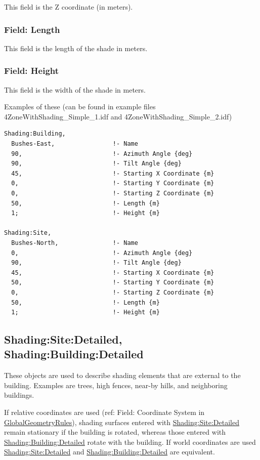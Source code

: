 This field is the Z coordinate (in meters).

\subsubsection{Field: Length}\label{field-length-16}

This field is the length of the shade in meters.

\subsubsection{Field: Height}\label{field-height-10}

This field is the width of the shade in meters.

Examples of these (can be found in example files 4ZoneWithShading\_Simple\_1.idf and 4ZoneWithShading\_Simple\_2.idf)

\begin{lstlisting}
Shading:Building,
  Bushes-East,                !- Name
  90,                         !- Azimuth Angle {deg}
  90,                         !- Tilt Angle {deg}
  45,                         !- Starting X Coordinate {m}
  0,                          !- Starting Y Coordinate {m}
  0,                          !- Starting Z Coordinate {m}
  50,                         !- Length {m}
  1;                          !- Height {m}

Shading:Site,
  Bushes-North,               !- Name
  0,                          !- Azimuth Angle {deg}
  90,                         !- Tilt Angle {deg}
  45,                         !- Starting X Coordinate {m}
  50,                         !- Starting Y Coordinate {m}
  0,                          !- Starting Z Coordinate {m}
  50,                         !- Length {m}
  1;                          !- Height {m}
\end{lstlisting}

\subsection{Shading:Site:Detailed, Shading:Building:Detailed}\label{shadingsitedetailed-shadingbuildingdetailed}

These objects are used to describe shading elements that are external to the building. Examples are trees, high fences, near-by hills, and neighboring buildings.

If relative coordinates are used (ref: Field: Coordinate System in \hyperref[globalgeometryrules]{GlobalGeometryRules}), shading surfaces entered with \hyperref[shadingsitedetailed-shadingbuildingdetailed]{Shading:Site:Detailed} remain stationary if the building is rotated, whereas those entered with \hyperref[shadingsitedetailed-shadingbuildingdetailed]{Shading:Building:Detailed} rotate with the building. If world coordinates are used \hyperref[shadingsitedetailed-shadingbuildingdetailed]{Shading:Site:Detailed} and \hyperref[shadingsitedetailed-shadingbuildingdetailed]{Shading:Building:Detailed} are equivalent.

